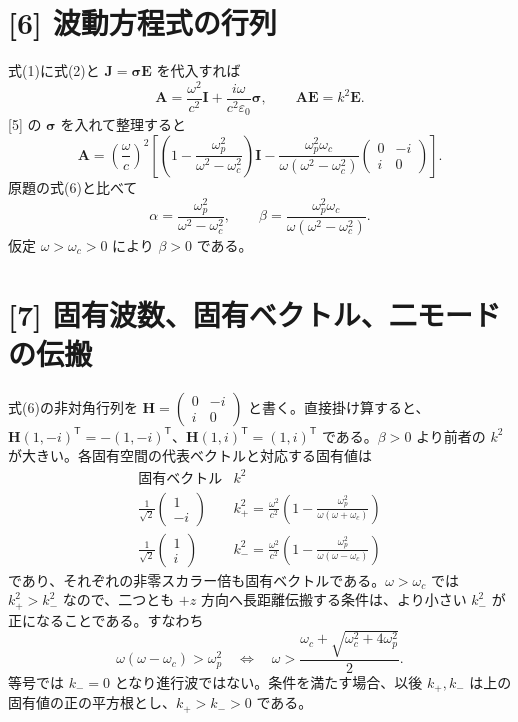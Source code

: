 \documentclass[11pt,a4paper]{article}
\begin{document}
\section*{[6] 波動方程式の行列}
式(1)に式(2)と $\boldsymbol J=\boldsymbol\sigma\boldsymbol E$ を代入すれば
\[
\boldsymbol A=\frac{\omega^2}{c^2}\mathbf I
+\frac{i\omega}{c^2\varepsilon_0}\boldsymbol\sigma,
\qquad \boldsymbol A\boldsymbol E=k^2\boldsymbol E.
\]
[5] の $\boldsymbol\sigma$ を入れて整理すると
\[
\boldsymbol A=\left(\frac\omega c\right)^2
\left[\left(1-\frac{\omega_p^2}{\omega^2-\omega_c^2}\right)\mathbf I
-\frac{\omega_p^2\omega_c}{\omega(\omega^2-\omega_c^2)}
\begin{pmatrix}0&-i\\i&0\end{pmatrix}\right].
\]
原題の式(6)と比べて
\[
\boxed{\alpha=\frac{\omega_p^2}{\omega^2-\omega_c^2},\qquad
\beta=\frac{\omega_p^2\omega_c}{\omega(\omega^2-\omega_c^2)}.}
\]
仮定 $\omega>\omega_c>0$ により $\beta>0$ である。

\section*{[7] 固有波数、固有ベクトル、二モードの伝搬}
式(6)の非対角行列を $\boldsymbol H=\begin{pmatrix}0&-i\\i&0\end{pmatrix}$ と書く。直接掛け算すると、$\boldsymbol H(1,-i)^{\mathsf T}=-(1,-i)^{\mathsf T}$、$\boldsymbol H(1,i)^{\mathsf T}=(1,i)^{\mathsf T}$ である。$\beta>0$ より前者の $k^2$ が大きい。各固有空間の代表ベクトルと対応する固有値は
\[
\boxed{\begin{array}{c|c}
\text{固有ベクトル}&k^2\\ \hline
\displaystyle\frac1{\sqrt2}\begin{pmatrix}1\\-i\end{pmatrix}&
\displaystyle k_+^2=\frac{\omega^2}{c^2}
\left(1-\frac{\omega_p^2}{\omega(\omega+\omega_c)}\right)\\[3mm]
\displaystyle\frac1{\sqrt2}\begin{pmatrix}1\\i\end{pmatrix}&
\displaystyle k_-^2=\frac{\omega^2}{c^2}
\left(1-\frac{\omega_p^2}{\omega(\omega-\omega_c)}\right)
\end{array}}
\]
であり、それぞれの非零スカラー倍も固有ベクトルである。$\omega>\omega_c$ では $k_+^2>k_-^2$ なので、二つとも $+z$ 方向へ長距離伝搬する条件は、より小さい $k_-^2$ が正になることである。すなわち
\[
\omega(\omega-\omega_c)>\omega_p^2
\quad\Longleftrightarrow\quad
\boxed{\omega>\frac{\omega_c+\sqrt{\omega_c^2+4\omega_p^2}}2.}
\]
等号では $k_-=0$ となり進行波ではない。条件を満たす場合、以後 $k_+,k_-$ は上の固有値の正の平方根とし、$k_+>k_->0$ である。
\end{document}
